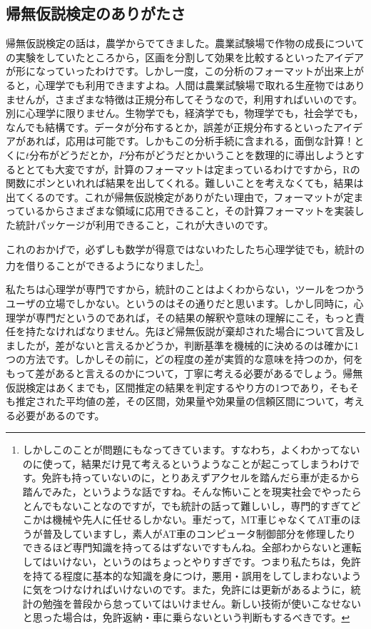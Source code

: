 \documentclass{ltjbook}
\begin{document}
\subsection{帰無仮説検定のありがたさ}
帰無仮説検定の話は，農学からでてきました。農業試験場で作物の成長についての実験をしていたところから，区画を分割して効果を比較するといったアイデアが形になっていったわけです。しかし一度，この分析のフォーマットが出来上がると，心理学でも利用できますよね。人間は農業試験場で取れる生産物ではありませんが，さまざまな特徴は正規分布してそうなので，利用すればいいのです。別に心理学に限りません。生物学でも，経済学でも，物理学でも，社会学でも，なんでも結構です。データが分布するとか，誤差が正規分布するといったアイデアがあれば，応用は可能です。しかもこの分析手続に含まれる，面倒な計算！とくに$t$分布がどうだとか，$F$分布がどうだとかいうことを数理的に導出しようとするととても大変ですが，計算のフォーマットは定まっているわけですから，Rの関数にポンといれれば結果を出してくれる。難しいことを考えなくても，結果は出てくるのです。これが帰無仮説検定がありがたい理由で，フォーマットが定まっているからさまざまな領域に応用できること，その計算フォーマットを実装した統計パッケージが利用できること，これが大きいのです。

これのおかげで，必ずしも数学が得意ではないわたしたち心理学徒でも，統計の力を借りることができるようになりました\footnote{しかしこのことが問題にもなってきています。すなわち，よくわかってないのに使って，結果だけ見て考えるというようなことが起こってしまうわけです。免許も持っていないのに，とりあえずアクセルを踏んだら車が走るから踏んでみた，というような話ですね。そんな怖いことを現実社会でやったらとんでもないことなのですが，でも統計の話って難しいし，専門的すぎてどこかは機械や先人に任せるしかない。車だって，MT車じゃなくてAT車のほうが普及していますし，素人がAT車のコンピュータ制御部分を修理したりできるほど専門知識を持ってるはずないですもんね。全部わからないと運転してはいけない，というのはちょっとやりすぎです。つまり私たちは，免許を持てる程度に基本的な知識を身につけ，悪用・誤用をしてしまわないように気をつけなければいけないのです。また，免許には更新があるように，統計の勉強を普段から怠っていてはいけません。新しい技術が使いこなせないと思った場合は，免許返納・車に乗らないという判断もするべきです。}。

私たちは心理学が専門ですから，統計のことはよくわからない，ツールをつかうユーザの立場でしかない。というのはその通りだと思います。しかし同時に，心理学が専門だというのであれば，その結果の解釈や意味の理解にこそ，もっと責任を持たなければなりません。先ほど帰無仮説が棄却された場合について言及しましたが，差がないと言えるかどうか，判断基準を機械的に決めるのは確かに1つの方法です。しかしその前に，どの程度の差が実質的な意味を持つのか，何をもって差があると言えるのかについて，丁寧に考える必要があるでしょう。帰無仮説検定はあくまでも，区間推定の結果を判定するやり方の1つであり，そもそも推定された平均値の差，その区間，効果量や効果量の信頼区間について，考える必要があるのです。
\end{document}
